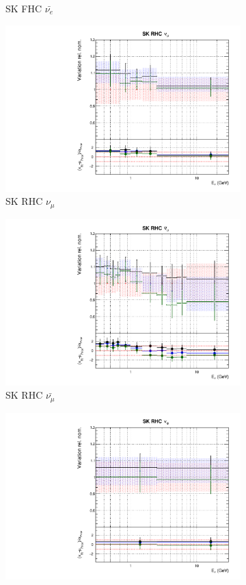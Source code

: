 \begin{figure}
\begin{subfigure}{0.45\textwidth}
  \caption{SK FHC $\bar{\nu_{e}}$}
\end{subfigure}
\begin{subfigure}{0.45\textwidth}
  \centering
  \includegraphics[width=0.75\linewidth]{figs/fhcrhcfitsflux_12}
  \caption{SK RHC $\nu_{\mu}$}
\end{subfigure}
\begin{subfigure}{0.45\textwidth}
  \centering
  \includegraphics[width=0.75\linewidth]{figs/fhcrhcfitsflux_13}
  \caption{SK RHC $\bar{\nu_{\mu}}$}
\end{subfigure}
\begin{subfigure}{0.45\textwidth}
  \centering
  \includegraphics[width=0.75\linewidth]{figs/fhcrhcfitsflux_14}

\end{subfigure}
\end{figure}
